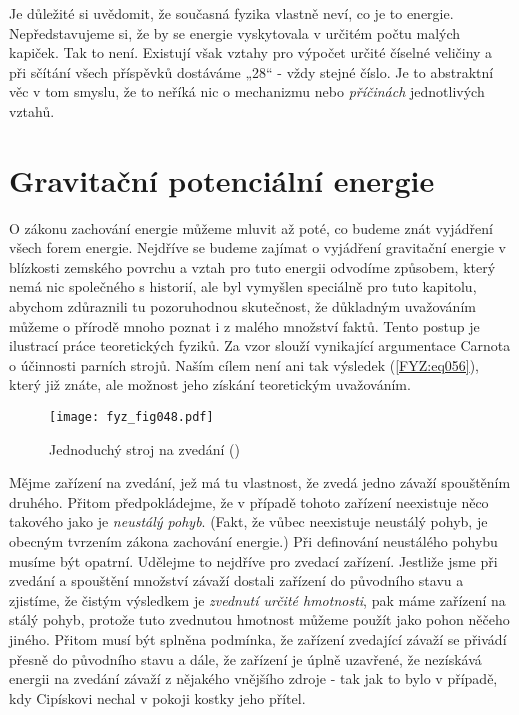 {    Je důležité si uvědomit, že současná fyzika vlastně neví, co je to energie. Nepředstavujeme si, 
    že by se energie vyskytovala v určitém počtu malých kapiček. Tak to není. Existují však vztahy 
    pro výpočet určité číselné veličiny a při sčítání všech příspěvků dostáváme „\num{28}“ - vždy 
    stejné číslo. Je to abstraktní věc v tom smyslu, že to neříká nic o mechanizmu nebo 
    \emph{příčinách} jednotlivých vztahů.
    
  \section{Gravitační potenciální energie}
    O zákonu zachování energie můžeme mluvit až poté, co budeme znát vyjádření všech forem energie. 
    Nejdříve se budeme zajímat o vyjádření gravitační energie v blízkosti zemského povrchu a vztah 
    pro tuto energii odvodíme způsobem, který nemá nic společného s historií, ale byl vymyšlen 
    speciálně pro tuto kapitolu, abychom zdůraznili tu pozoruhodnou skutečnost, že důkladným 
    uvažováním můžeme o přírodě mnoho poznat i z malého množství faktů. Tento postup je ilustrací 
    práce teoretických fyziků. Za vzor slouží vynikající argumentace Carnota o účinnosti parních 
    strojů. Naším cílem není ani tak výsledek (\ref{FYZ:eq056}), který již znáte, ale možnost jeho 
    získání teoretickým uvažováním.

    \begin{wrapfigure}[8]{r}{5cm}  %
      \centering
      \texttt{[image: fyz\_fig048.pdf]}
      \caption{Jednoduchý stroj na zvedání (\cite[s.~52]{Feynman01})}
      \label{fyz:fig048}
    \end{wrapfigure}
    Mějme zařízení na zvedání, jež má tu vlastnost, že zvedá jedno závaží spouštěním druhého. 
    Přitom předpokládejme, že v případě tohoto zařízení neexistuje něco takového jako je 
    \emph{neustálý pohyb}. (Fakt, že vůbec neexistuje neustálý pohyb, je obecným tvrzením zákona 
    zachování energie.) Při definování neustálého pohybu musíme být opatrní. Udělejme to nejdříve 
    pro zvedací zařízení. Jestliže jsme při zvedání a spouštění množství závaží dostali zařízení do 
    původního stavu a zjistíme, že čistým výsledkem je \emph{zvednutí určité hmotnosti}, pak máme 
    zařízení na stálý pohyb, protože tuto zvednutou hmotnost můžeme použít jako pohon něčeho 
    jiného. Přitom musí být splněna podmínka, že zařízení zvedající závaží se přivádí přesně do 
    původního stavu a dále, že zařízení je úplně uzavřené, že nezískává energii na zvedání závaží z 
    nějakého vnějšího zdroje - tak jak to bylo v případě, kdy Cipískovi nechal v pokoji kostky jeho 
    přítel.
    
}
